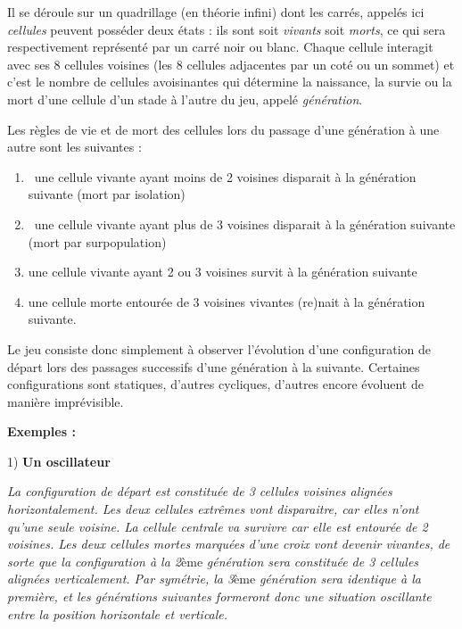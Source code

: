 {
{Il se déroule sur un quadrillage (en théorie
infini) dont les carrés, appelés ici
}{\textit{cellules}}{
peuvent posséder deux états : ils sont soit
}{\textit{vivants}}{
soit
}{\textit{morts}}{, ce
qui sera respectivement représenté par un carré noir ou blanc. Chaque
cellule interagit avec ses 8 cellules voisines (les 8 cellules
adjacentes par un coté ou un sommet) et c’est le nombre de cellules
avoisinantes qui détermine la naissance, la survie ou la mort d’une
cellule d’un stade à l’autre du jeu, appelé
}{\textit{génération}}{.}}

{
Les règles de vie et de mort des cellules lors du passage d’une
génération à une autre sont les suivantes :}

\liststyleNumberingi
\begin{enumerate}
\item {
\ une cellule vivante ayant moins de 2 voisines disparait à la
génération suivante (mort par isolation)}
\item {
\ une cellule vivante ayant plus de 3 voisines disparait à la génération
suivante (mort par surpopulation)}
\item {
une cellule vivante ayant 2 ou 3 voisines survit à la génération
suivante}
\item {
une cellule morte entourée de 3 voisines vivantes (re)nait à la
génération suivante.}
\end{enumerate}
{
Le jeu consiste donc simplement à observer l’évolution d’une
configuration de départ lors des passages successifs d’une génération à
la suivante. Certaines configurations sont statiques, d’autres
cycliques, d’autres encore évoluent de manière imprévisible.}

{\bfseries
{Exemples}{ : }}

{\sffamily
{1) }{\textbf{Un
oscillateur}}}


\bigskip

{\sffamily
{\textit{La configuration de départ est
constituée de 3 cellules voisines alignées horizontalement. Les deux
cellules extrêmes vont disparaitre, car elles n’ont qu’une seule
voisine. La cellule centrale va survivre car elle est entourée de 2
voisines. Les deux cellules mortes marquées d’une croix vont devenir
vivantes, de sorte que la configuration à la
2}}ème{\textit{ génération sera constituée de 3
cellules alignées verticalement. Par symétrie, la
3}}ème{\textit{ génération sera identique à la
première, et les générations suivantes formeront donc une situation
oscillante entre la position horizontale et verticale.}}}

